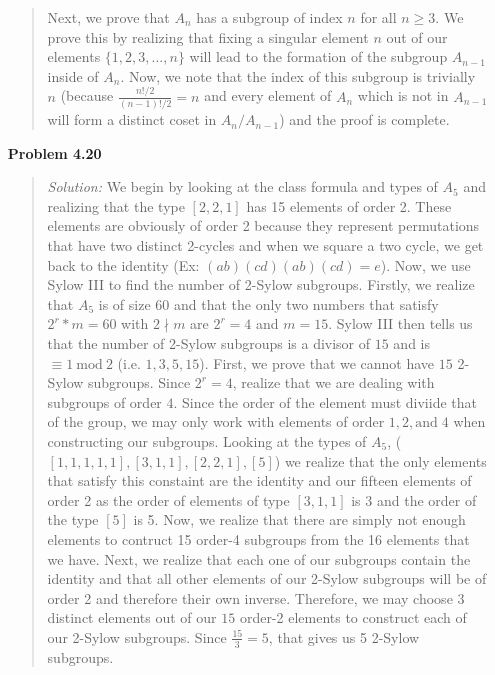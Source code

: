 \documentclass{article}
\newcommand{\Solution}{\textit{Solution: }}
\begin{document}
\begin{enumerate}
\begin{quote}
            Next, we prove that $A_n$ has a subgroup of index $n$ for all $n \geq 3$. We prove this by realizing that fixing a singular element $n$ out of our elements $\{1, 2, 3, \dots, n\}$ will lead 
            to the formation of the subgroup $A_{n-1}$ inside of $A_n$. Now, we note that the index of this subgroup is trivially $n$ (because $\frac{n!/2}{(n-1)!/2} = n$ and every element of $A_n$ which is
            not in $A_{n - 1}$ will form a distinct coset in $A_n/A_{n - 1}$) and the proof is complete. \qedsymbol
        \end{quote}
        \item[\textbf{Problem 4.20}]
        \begin{quote}
            \Solution We begin by looking at the class formula and types of $A_5$ and realizing that the type $[2, 2, 1]$ has 15 elements of order 2. These elements are obviously of order 2 because they represent 
            permutations that have two distinct 2-cycles and when we square a two cycle, we get back to the identity (Ex: $(ab)(cd)(ab)(cd) = e$). Now, we use Sylow III to find the number of 2-Sylow subgroups. Firstly,
            we realize that $A_5$ is of size 60 and that the only two numbers that satisfy $2^r*m = 60$ with $2 \nmid m$ are $2^r = 4$ and $m = 15$. Sylow III then tells us that the number of 2-Sylow subgroups is a divisor
            of $15$ and is $\equiv 1 \: \text{mod} \: 2$ (i.e. $1, 3, 5, 15$). First, we prove that we cannot have $15$ 2-Sylow subgroups. Since $2^r = 4$, realize that we are dealing with subgroups of order $4$. Since the order of the element must diviide that
            of the group, we may only work with elements of order $1, 2, \text{and} \; 4$ when constructing our subgroups. Looking at the types of $A_5$, ($[1,1,1,1,1], [3,1,1], [2,2,1], [5]$) we realize that the only elements
            that satisfy this constaint are the identity and our fifteen elements of order 2 as the order of elements of type $[3, 1, 1]$ is 3 and the order of the type $[5]$ is 5. Now, we realize that there are simply not
            enough elements to contruct 15 order-4 subgroups from the 16 elements that we have. Next, we realize that each one of our subgroups contain the identity and that all other elements of our 2-Sylow subgroups will be of
            order 2 and therefore their own inverse. Therefore, we may choose 3 distinct elements out of our $15$ order-2 elements to construct each of our 2-Sylow subgroups. Since $\frac{15}{3} = 5$, that gives us 5 2-Sylow subgroups.
            \qedsymbol
        \end{quote}

\end{enumerate}
\end{document}
